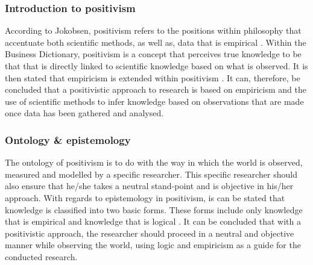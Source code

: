 \subsubsection{Introduction to positivism} 
According to Jokobsen, positivism refers to the positions within philosophy that accentuate both scientific methods, as well as, data that is empirical \cite{Jakobsen2013}. Within the Business Dictionary, positivism is a concept that perceives true knowledge to be that that is directly linked to scientific knowledge based on what is observed. It is then stated that empiricism is extended within positivism \cite{BusinessDictionary}. 
It can, therefore, be concluded that a positivistic approach to research is based on empiricism and the use of scientific methods to infer knowledge based on observations that are made once data has been gathered and analysed.
\subsubsection{Ontology \& epistemology}
The ontology of positivism is to do with the way in which the world is observed, measured and modelled by a specific researcher. This specific researcher should also ensure that he/she takes a neutral stand-point and is objective in his/her approach. 
With regards to epistemology in positivism, is can be stated that knowledge is classified into two basic forms. These forms include only knowledge that is empirical and knowledge that is logical \cite{OatesJ2006}.
It can be concluded that with a positivistic approach, the researcher should proceed in a neutral and objective manner while observing the world, using logic and empiricism as a guide for the conducted research.
